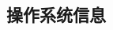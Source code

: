 \documentclass[class=book, crop=false]{standalone}
\begin{document}
\begin{CJK}{UTF8}{gbsn}

\chapter{操作系统信息}





\cleardoublepage

\end{CJK}
\end{document}
